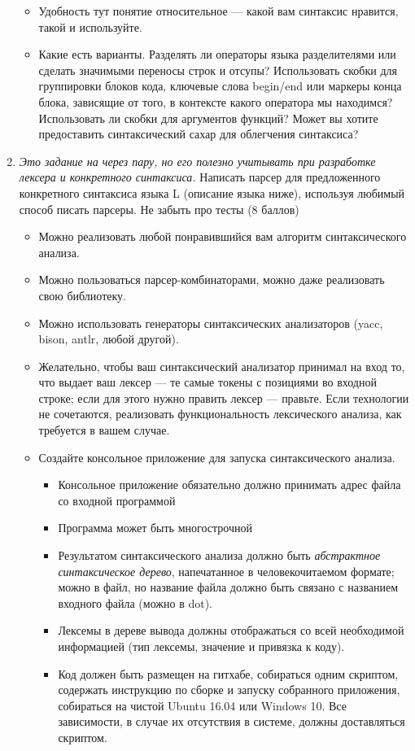 \documentclass{article}
\begin{document}
\begin{enumerate}
  \begin{itemize}
    \item Удобность тут понятие относительное --- какой вам синтаксис нравится, такой и используйте.
    \item Какие есть варианты. Разделять ли операторы языка разделителями или сделать значимыми переносы строк и отсупы? Использовать скобки для группировки блоков кода, ключевые слова begin/end или маркеры конца блока, зависящие от того, в контексте какого оператора мы находимся? Использовать ли скобки для аргументов функций? Может вы хотите предоставить синтаксический сахар для облегчения синтаксиса? 
  \end{itemize}
  \item \emph{Это задание на через пару, но его полезно учитывать при разработке лексера и конкретного синтаксиса.} Написать парсер для предложенного конкретного синтаксиса языка L (описание языка ниже), используя любимый способ писать парсеры. Не забыть про тесты (8 баллов)
    \begin{itemize}
        \item Можно реализовать любой понравившийся вам алгоритм синтаксического анализа.
        \item Можно пользоваться парсер-комбинаторами, можно даже реализовать свою библиотеку.
        \item Можно использовать генераторы синтаксических анализаторов (yacc, bison, antlr, любой другой).
        \item Желательно, чтобы ваш синтаксический анализатор принимал на вход то, что выдает ваш лексер --- те самые токены с позициями во входной строке; если для этого нужно править лексер --- правьте. Если технологии не сочетаются, реализовать функциональность лексического анализа, как требуется в вашем случае.
        \item Создайте консольное приложение для запуска синтаксического анализа.
        \begin{itemize}
            \item Консольное приложение обязательно должно принимать адрес файла со входной программой
            \item Программа может быть многострочной
            \item Результатом синтаксического анализа должно быть \emph{абстрактное синтаксическое дерево}, напечатанное в человекочитаемом формате; можно в файл, но название файла должно быть связано с названием входного файла (можно в dot).
            \item Лексемы в дереве вывода должны отображаться со всей необходимой информацией (тип лексемы, значение и привязка к коду).
            \item Код должен быть размещен на гитхабе, собираться одним скриптом, содержать инструкцию по сборке и запуску собранного приложения, собираться на чистой Ubuntu 16.04 или Windows 10. Все зависимости, в случае их отсутствия в системе, должны доставляться скриптом.
        \end{itemize}
     \end{itemize}
\end{enumerate}
\end{document}
